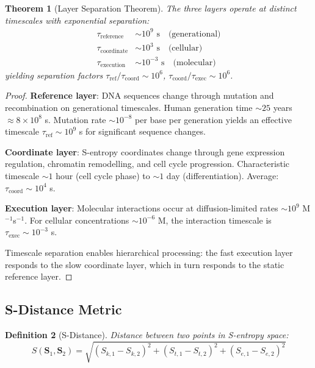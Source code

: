 \documentclass[11pt,a4paper]{article}
\newtheorem{theorem}{Theorem}[section]
\newtheorem{definition}[theorem]{Definition}
\theoremstyle{remark}
\newcommand{\Scoord}{\mathbf{S}}
\begin{document}
\begin{theorem}[Layer Separation Theorem]
\label{thm:layer_separation}
The three layers operate at distinct timescales with exponential separation:
\begin{align}
\tau_{\text{reference}} &\sim 10^9 \text{ s} \quad \text{(generational)} \\
\tau_{\text{coordinate}} &\sim 10^3 \text{ s} \quad \text{(cellular)} \\
\tau_{\text{execution}} &\sim 10^{-3} \text{ s} \quad \text{(molecular)}
\end{align}
yielding separation factors $\tau_{\text{ref}}/\tau_{\text{coord}} \sim 10^6$, $\tau_{\text{coord}}/\tau_{\text{exec}} \sim 10^6$.
\end{theorem}

\begin{proof}
\textbf{Reference layer}: DNA sequences change through mutation and recombination on generational timescales. Human generation time $\sim 25$ years $\approx 8 \times 10^8$ s. Mutation rate $\sim 10^{-8}$ per base per generation yields an effective timescale $\tau_{\text{ref}} \sim 10^9$ s for significant sequence changes.

\textbf{Coordinate layer}: S-entropy coordinates change through gene expression regulation, chromatin remodelling, and cell cycle progression. Characteristic timescale $\sim 1$ hour (cell cycle phase) to $\sim 1$ day (differentiation). Average: $\tau_{\text{coord}} \sim 10^4$ s.

\textbf{Execution layer}: Molecular interactions occur at diffusion-limited rates $\sim 10^9$ M$^{-1}$s$^{-1}$. For cellular concentrations $\sim 10^{-6}$ M, the interaction timescale is $\tau_{\text{exec}} \sim 10^{-3}$ s.

Timescale separation enables hierarchical processing: the fast execution layer responds to the slow coordinate layer, which in turn responds to the static reference layer.
\end{proof}

\subsection{S-Distance Metric}

\begin{definition}[S-Distance]
\label{def:s_distance}
Distance between two points in S-entropy space:
\begin{equation}
S(\Scoord_1, \Scoord_2) = \sqrt{(S_{k,1} - S_{k,2})^2 + (S_{t,1} - S_{t,2})^2 + (S_{e,1} - S_{e,2})^2}
\end{equation}
\end{definition}
\end{document}
